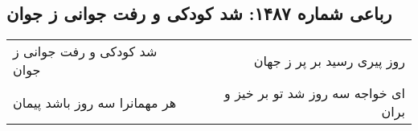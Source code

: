 \begin{center}
\section*{رباعی شماره ۱۴۸۷: شد کودکی و رفت جوانی ز جوان}
\label{sec:1487}
\begin{longtable}{l p{0.5cm} r}
شد کودکی و رفت جوانی ز جوان
&&
روز پیری رسید بر پر ز جهان
\\
هر مهمانرا سه روز باشد پیمان
&&
ای خواجه سه روز شد تو بر خیز و بران
\\
\end{longtable}
\end{center}
